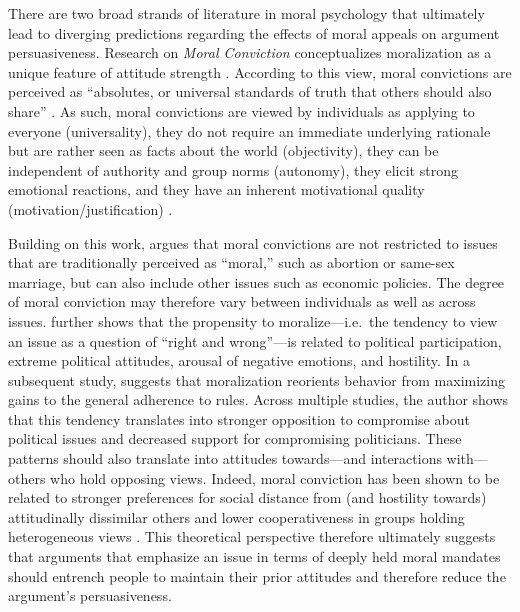 There are two broad strands of literature in moral psychology that ultimately lead to diverging predictions regarding the effects of moral appeals on argument persuasiveness. Research on \textit{Moral Conviction} conceptualizes moralization as a unique feature of attitude strength \citep{skitka2005moral}. According to this view, moral convictions are perceived as ``absolutes, or universal standards of truth that others should also share'' \citep[269]{skitka2010psychology}. As such, moral convictions are viewed by individuals as applying to everyone (universality), they do not require an immediate underlying rationale but are rather seen as facts about the world (objectivity), they can be independent of authority and group norms (autonomy), they elicit strong emotional reactions, and they have an inherent motivational quality (motivation/justification) \citep{skitka2010psychology}.

Building on this work, \citet{ryan2014reconsidering} argues that moral convictions are not restricted to issues that are traditionally perceived as ``moral,'' such as abortion or same-sex marriage, but can also include other issues such as economic policies. The degree of moral conviction may therefore vary between individuals as well as across issues. \citet{ryan2014reconsidering} further shows that the propensity to moralize---i.e.~the tendency to view an issue as a question of ``right and wrong''---is related to political participation, extreme political attitudes, arousal of negative emotions, and hostility. In a subsequent study, \citet{ryan2017no} suggests that moralization reorients behavior from maximizing gains to the general adherence to rules. Across multiple studies, the author shows that this tendency translates into stronger opposition to compromise about political issues and decreased support for compromising politicians. These patterns should also translate into attitudes towards---and interactions with---others who hold opposing views. Indeed, moral conviction has been shown to be related to stronger preferences for social distance from (and hostility towards) attitudinally dissimilar others and lower cooperativeness in groups holding heterogeneous views \citep{skitka2005moral}. This theoretical perspective therefore ultimately suggests that arguments that emphasize an issue in terms of deeply held moral mandates should entrench people to maintain their prior attitudes and therefore reduce the argument's persuasiveness.

